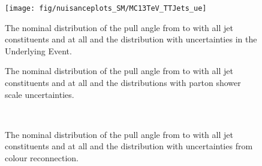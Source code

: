 \begin{figure}[hbtp]
  \def\twidth{0.45}
  \centering
  \texttt{[image: fig/nuisanceplots\_SM/MC13TeV\_TTJets\_ue]}
  \caption{The nominal distribution of the pull angle from \leadingjet to \scndleadingjet with all jet constituents and at all \DeltaR and the distribution with uncertainties in the Underlying Event.}
  \label{fig:MC13TeV_TTJets_ue}
\end{figure}

\begin{figure}[hbtp]
  \def\twidth{0.45}
  \centering

  \hfil
  \caption{The nominal distribution of the pull angle from \leadingjet to \scndleadingjet with all jet constituents and at all \DeltaR and the distributions with parton shower scale uncertainties.}
  \label{fig:MC13TeV_TTJets_PS}
\end{figure}

\begin{figure}[hbtp]
  \def\twidth{0.45}
  \centering
  \hfil
  \\
  \caption{The nominal distribution of the pull angle from \leadingjet to \scndleadingjet with all jet constituents and at all \DeltaR and the distribution with uncertainties from colour reconnection.}
  \label{fig:MC13TeV_TTJets_CR}

\end{figure}
